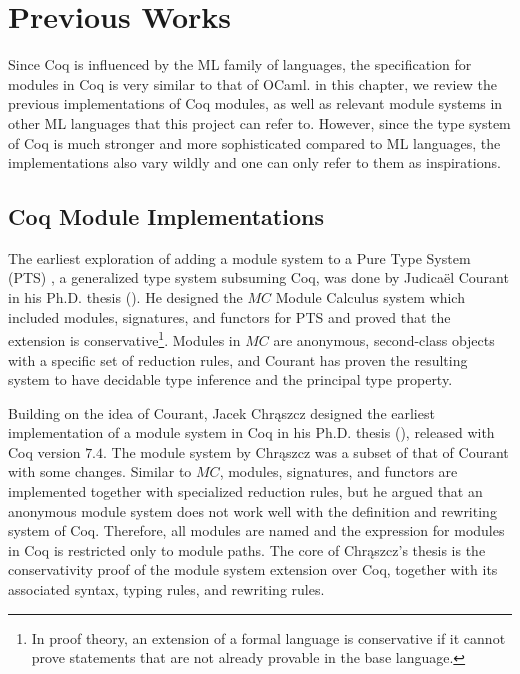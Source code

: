 \chapter{Previous Works}
\label{ch:previous-works}

Since Coq is influenced by the ML family of languages, the specification for
modules in Coq is very similar to that of OCaml. in this chapter, we review the
previous implementations of Coq modules, as well as relevant module systems in
other ML languages that this project can refer to. However, since the type
system of Coq is much stronger and more sophisticated compared to ML languages,
the implementations also vary wildly and one can only refer to them as
inspirations.



\section{Coq Module Implementations}
The earliest exploration of adding a module system to a Pure Type System (PTS)
, a
generalized type system subsuming Coq, was done by Judicaël Courant in his Ph.D.
thesis (\cite{courant1997module}). He designed the $MC$ Module Calculus system
which included modules, signatures, and functors for PTS and proved that the
extension is conservative\footnote{In proof theory, an extension of a formal
language is conservative if it cannot prove statements that are not already
provable in the base language.}. Modules in $MC$ are anonymous, second-class
objects with a specific set of reduction rules, and Courant has proven the
resulting system to have decidable type inference and the principal type
property.

Building on the idea of Courant, Jacek Chrąszcz designed the earliest
implementation of a module system in Coq in his Ph.D. thesis
(\cite{chrzkaszcz2004modules}), released with Coq version $7.4$. The module
system by Chrąszcz was a subset of that of Courant with some changes. Similar to
$MC$, modules, signatures, and functors are implemented together with
specialized reduction rules, but he argued that an anonymous module system does
not work well with the definition and rewriting system of Coq. Therefore, all
modules are named and the expression for modules in Coq is restricted only to
module paths. The core of Chrąszcz's thesis is the conservativity proof of the
module system extension over Coq, together with its associated syntax, typing
rules, and rewriting rules.

